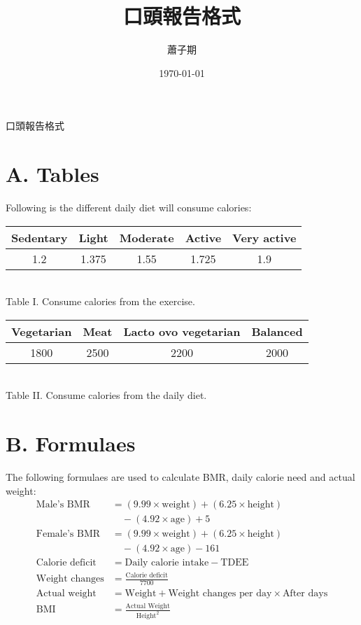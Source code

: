 \documentclass{article}
\title{口頭報告格式}
\author{蕭子期}
\date{\today}
\begin{document}
\thispagestyle{fancy}
\begin{center}
\fontsize{16pt}{16pt}\selectfont 口頭報告格式
\end{center}
\fontsize{14pt}{14pt}\selectfont
\section*{A. Tables}
Following is the different daily diet will consume calories: \\
\begin{center}
\begin{tabular}{|c|c|c|c|c|}
\hline
Sedentary & Light & Moderate & Active & Very active \\
\hline
1.2 & 1.375 & 1.55 & 1.725 & 1.9 \\
\hline
\end{tabular}
\vspace{1em} \\
Table I. Consume calories from the exercise. 
\vspace{1em} \\
\begin{tabular}{|c|c|c|c|}
\hline
Vegetarian & Meat & Lacto ovo vegetarian & Balanced \\
\hline
1800 & 2500 & 2200 & 2000 \\
\hline
\end{tabular}
\vspace{1em} \\
Table II. Consume calories from the daily diet.
\end{center}
\section*{B. Formulaes}
The following formulaes are used to calculate BMR, daily calorie need and actual weight:
\begin{align*}
\text{Male's BMR} &= (9.99 \times \text{weight}) + (6.25 \times \text{height}) \\
&\quad - (4.92 \times \text{age}) + 5 \\
\text{Female's BMR} &= (9.99 \times \text{weight}) + (6.25 \times \text{height}) \\
&\quad - (4.92 \times \text{age}) - 161 \\
\text{Calorie deficit} &= \text{Daily calorie intake} - \text{TDEE} \\
\text{Weight changes} &= \frac{\text{Calorie deficit}}{7700} \\
\text{Actual weight} &= \text{Weight} + \text{Weight changes per day} \times \text{After days} \\
\text{BMI} &= \frac{\text{Actual Weight}}{\text{Height}^2}
\end{align*}
\end{document}
